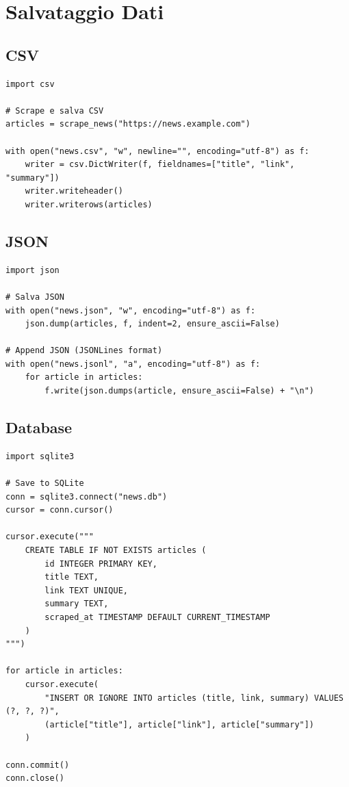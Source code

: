 \section{Salvataggio Dati}

\subsection{CSV}

\begin{lstlisting}
import csv

# Scrape e salva CSV
articles = scrape_news("https://news.example.com")

with open("news.csv", "w", newline="", encoding="utf-8") as f:
    writer = csv.DictWriter(f, fieldnames=["title", "link", "summary"])
    writer.writeheader()
    writer.writerows(articles)
\end{lstlisting}

\subsection{JSON}

\begin{lstlisting}
import json

# Salva JSON
with open("news.json", "w", encoding="utf-8") as f:
    json.dump(articles, f, indent=2, ensure_ascii=False)

# Append JSON (JSONLines format)
with open("news.jsonl", "a", encoding="utf-8") as f:
    for article in articles:
        f.write(json.dumps(article, ensure_ascii=False) + "\n")
\end{lstlisting}

\subsection{Database}

\begin{lstlisting}
import sqlite3

# Save to SQLite
conn = sqlite3.connect("news.db")
cursor = conn.cursor()

cursor.execute("""
    CREATE TABLE IF NOT EXISTS articles (
        id INTEGER PRIMARY KEY,
        title TEXT,
        link TEXT UNIQUE,
        summary TEXT,
        scraped_at TIMESTAMP DEFAULT CURRENT_TIMESTAMP
    )
""")

for article in articles:
    cursor.execute(
        "INSERT OR IGNORE INTO articles (title, link, summary) VALUES (?, ?, ?)",
        (article["title"], article["link"], article["summary"])
    )

conn.commit()
conn.close()
\end{lstlisting}

